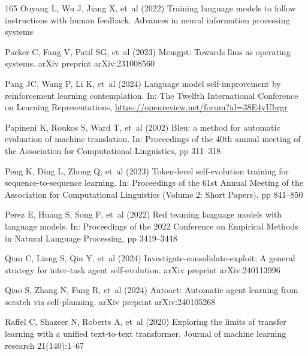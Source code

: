 \documentclass[sn-basic, Numbered]{sn-jnl}%
\theoremstyle{thmstyleone}%
\theoremstyle{thmstyletwo}%
\theoremstyle{thmstylethree}%
\begin{document}
\begin{thebibliography}{165}
Ouyang L, Wu J, Jiang X, et~al (2022) Training language models to follow instructions with human feedback. Advances in neural information processing systems

Packer C, Fang V, Patil SG, et~al (2023) Memgpt: Towards llms as operating systems. arXiv preprint arXiv:231008560

Pang JC, Wang P, Li K, et~al (2024) Language model self-improvement by reinforcement learning contemplation. In: The Twelfth International Conference on Learning Representations, \urlprefix\url{https://openreview.net/forum?id=38E4yUbrgr}

Papineni K, Roukos S, Ward T, et~al (2002) Bleu: a method for automatic evaluation of machine translation. In: Proceedings of the 40th annual meeting of the Association for Computational Linguistics, pp 311--318

Peng K, Ding L, Zhong Q, et~al (2023) Token-level self-evolution training for sequence-to-sequence learning. In: Proceedings of the 61st Annual Meeting of the Association for Computational Linguistics (Volume 2: Short Papers), pp 841--850

Perez E, Huang S, Song F, et~al (2022) Red teaming language models with language models. In: Proceedings of the 2022 Conference on Empirical Methods in Natural Language Processing, pp 3419--3448

Qian C, Liang S, Qin Y, et~al (2024) Investigate-consolidate-exploit: A general strategy for inter-task agent self-evolution. arXiv preprint arXiv:240113996

Qiao S, Zhang N, Fang R, et~al (2024) Autoact: Automatic agent learning from scratch via self-planning. arXiv preprint arXiv:240105268

Raffel C, Shazeer N, Roberts A, et~al (2020) Exploring the limits of transfer learning with a unified text-to-text transformer. Journal of machine learning research 21(140):1--67


\end{thebibliography}
\end{document}
